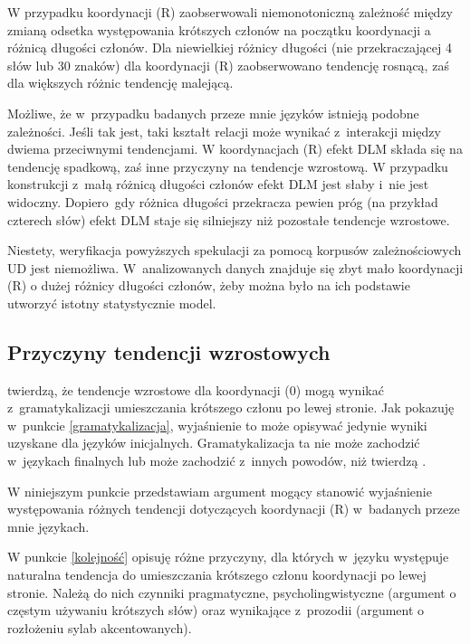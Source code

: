 W przypadku koordynacji (R) \cite{przepiorkowski2024argument} zaobserwowali niemonotoniczną zależność między zmianą odsetka występowania krótszych członów na początku koordynacji a różnicą długości członów. Dla niewielkiej różnicy długości (nie przekraczającej 4 słów lub 30 znaków) dla koordynacji (R) zaobserwowano tendencję rosnącą, zaś dla większych różnic tendencję malejącą. 

Możliwe, że w~przypadku badanych przeze mnie języków istnieją podobne zależności. Jeśli tak jest, taki kształt relacji  może wynikać z~interakcji między dwiema przeciwnymi tendencjami. W koordynacjach (R) efekt DLM składa się na tendencję spadkową, zaś inne przyczyny na tendencje wzrostową. W przypadku konstrukcji z~małą różnicą długości członów efekt DLM jest słaby i~nie jest widoczny. Dopiero~gdy różnica długości przekracza pewien próg (na przykład czterech słów) efekt DLM staje się silniejszy niż pozostałe tendencje wzrostowe.

Niestety, weryfikacja powyższych spekulacji za pomocą korpusów zależnościowych UD jest niemożliwa. W~analizowanych danych znajduje się zbyt mało koordynacji (R) o dużej różnicy długości członów, żeby można było na ich podstawie utworzyć istotny statystycznie model.

\subsection{Przyczyny tendencji wzrostowych}

\cite{przepiorkowski2023conjunct} twierdzą, że tendencje wzrostowe dla koordynacji (0) mogą wynikać z~gramatykalizacji umieszczania krótszego członu po lewej stronie. Jak pokazuję w~punkcie \ref{gramatykalizacja}, wyjaśnienie to może opisywać jedynie wyniki uzyskane dla języków inicjalnych. Gramatykalizacja ta nie może zachodzić w~językach finalnych lub może zachodzić z~innych powodów, niż twierdzą \cite{przepiorkowski2023conjunct}.

W niniejszym punkcie przedstawiam argument mogący stanowić wyjaśnienie występowania różnych tendencji dotyczących koordynacji (R) w~badanych przeze mnie językach.

W punkcie \ref{kolejność} opisuję różne przyczyny, dla których w~języku występuje naturalna tendencja do umieszczania krótszego członu koordynacji po lewej stronie. Należą do nich czynniki pragmatyczne, psycholingwistyczne (argument o częstym używaniu krótszych słów) oraz  wynikające z~prozodii (argument o rozłożeniu sylab akcentowanych). 

